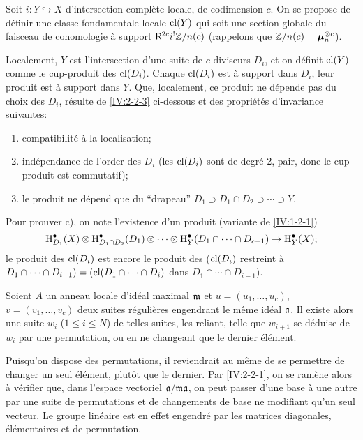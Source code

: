 Soit $i:Y\hookrightarrow X$ d'intersection compl\`ete locale, de codimension 
$c$. On se propose de d\'efinir une classe fondamentale locale 
$\operatorname{cl}(Y)$ qui soit une section globale du faisceau de cohomologie \`a support 
$\mathsf{R}^{2c}i^! \mathbb{Z}/n(c)$ (rappelons que $\mathbb{Z}/n(c)={\bm\mu}_n^{\otimes c}$). 

Localement, $Y$ est l'intersection d'une suite de $c$ diviseurs $D_i$, et on 
d\'efinit $\operatorname{cl}(Y)$ comme le cup-produit des $\operatorname{cl}(D_i)$. Chaque $\operatorname{cl}(D_i)$ est 
\`a support dans $D_i$, leur produit est \`a support dans $Y$. Que, localement, 
ce produit ne d\'epende pas du choix des $D_i$, r\'esulte de \ref{IV:2-2-3} 
ci-dessous et des propri\'et\'es d'invariance suivantes:
\begin{enumerate}[\indent a)]
  \item compatibilit\'e \`a la localisation;
  \item ind\'ependance de l'order des $D_i$ (les $\operatorname{cl}(D_i)$ sont de degr\'e 
    $2$, pair, donc le cup-produit est commutatif);
  \item le produit ne d\'epend que du ``drapeau'' 
    $D_1\supset D_1\cap D_2\supset \cdots\supset Y$. 
\end{enumerate}
Pour prouver c), on note l'existence d'un produit (variante de \ref{IV:1-2-1}) 
\[
  \operatorname{H}_{D_1}^\bullet(X)\otimes \operatorname{H}_{D_1\cap D_2}^\bullet(D_1)\otimes \cdots \otimes \operatorname{H}_Y^\bullet(D_1\cap \cdots \cap D_{c-1}) \to \operatorname{H}_Y^\bullet(X) \text{;}
\]
le produit des $\operatorname{cl}(D_i)$ est encore le produit des ($\operatorname{cl}(D_i)$ restreint \`a 
$D_1\cap \cdots \cap D_{i-1})=(\operatorname{cl}(D_1\cap \cdots \cap D_i)$ dans 
$D_1\cap \cdots \cap D_{i-1})$. 





\begin{lemma}\label{IV:2-2-3}
Soient $A$ un anneau locale d'id\'eal maximal $\mathfrak{m}$ et $u=(u_1,\dots,u_c)$, 
$v=(v_1,\dots,v_c)$ deux suites r\'eguli\`eres engendrant le m\^eme id\'eal 
$\mathfrak{a}$. Il existe alors une suite $w_i$ ($1\leqslant i\leqslant N$) de telles 
suites, les reliant, telle que $w_{i+1}$ se d\'eduise de $w_i$ par une 
permutation, ou en ne changeant que le dernier \'el\'ement.
\end{lemma}

Puisqu'on dispose des permutations, il reviendrait au m\^eme de se permettre de 
changer un seul \'el\'ement, plut\^ot que le dernier. Par \ref{IV:2-2-1}, on se 
ram\`ene alors \`a v\'erifier que, dans l'espace vectoriel $\mathfrak{a}/\mathfrak{m}\mathfrak{a}$, on 
peut passer d'une base \`a une autre par une suite de permutations et de 
changements de base ne modifiant qu'un seul vecteur. Le groupe lin\'eaire est 
en effet engendr\'e par les matrices diagonales, \'el\'ementaires et de 
permutation. 





